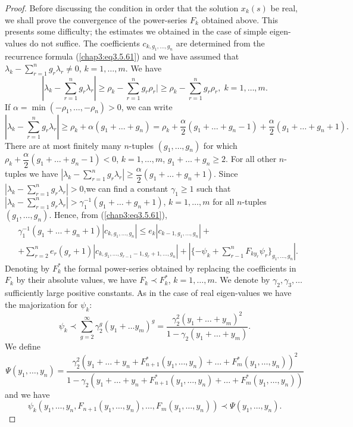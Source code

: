 \begin{proof}
Before discussing the condition in order that the solution $x_k(s)$ be
real, we shall prove the convergence of the power-series $F_k$
obtained above. This presents some difficulty; the estimates we
obtained in the case of simple eigen-values do not suffice. The
coefficients $c_{k, g_1, \ldots, g_n}$ are determined from the
recurrence formula (\ref{chap3:eq3.5.61}) and we have assumed that
$\lambda_k - \sum\limits^n_{r=1} g_r \lambda_r \neq 0$, $k=1, \ldots,
m$. We have 
$$
|\lambda_k - \sum\limits^n_{r=1} g_r \lambda_r | \geq \rho_k -
\sum\limits^n_{r=1} g_r \rho_r | \geq \rho_k - \sum\limits^n_{r=1} g_r
\rho_r, \; k =1, \ldots, m. 
$$
If $\alpha = \min (-\rho_1, \ldots, -\rho_n) > 0$, we can write  
{\fontsize{10}{12}\selectfont
$$
|\lambda_k - \sum\limits^n_{r=1} g_r \lambda_r| \geq \rho_k  + \alpha
(g_1+ \ldots + g_n) = \rho_k + \frac{\alpha}{2} (g_1 + \ldots + g_n
-1) + \frac{\alpha}{2} (g_1 + \ldots + g_n +1).  
$$}
There are at most finitely many $n$-tuples $(g_1, \ldots,g_n)$ for
which $\rho_k + \dfrac{\alpha}{2} (g_1+ \ldots + g_n -1) < 0$, $k=1,
\ldots, m$, $g_1 + \ldots + g_n \geq 2$. For all other $n$-tuples we
have $|\lambda_k - \sum\limits^n_{r=1} g_r \lambda_r| \geq
\dfrac{\alpha}{2} (g_1 + \ldots + g_n  +1)$. Since $|\lambda_k -
\sum\limits^n_{r=1} g_r \lambda_r| > 0$,\pageoriginale we can find a
constant $\gamma_1 \geq 1$ such that $|\lambda_k - \sum\limits^n_{r=1}
g_r \lambda_r| > \gamma^{-1}_1 (g_1+ \ldots + g_n +1)$, $k=1, \ldots,
m$ for all $n$-tuples $(g_1, \ldots, g_n)$. Hence, from
(\ref{chap3:eq3.5.61}), 
\begin{align*}
& \gamma^{-1}_1 (g_1 + \ldots + g_n +1) |c_{k, g_1, \ldots, g_n}| \leq
  e_k |c_{k-1, g_1, \ldots, g_n}| + \\ 
& + \sum\limits^n_{r=2} e_r (g_r+1) |c_{k, g_1, \ldots, g_{r-1} -1,
    g_r + 1, \ldots, g_n}| + |\{-\psi_k + \sum\limits^n_{r-1} F_{ky_r}
  \psi_r\}_{g_1, \ldots, g_n}|. 
\tag{3.5.62}\label{chap3:eq3.5.62}
\end{align*}
Denoting by $F^*_k$ the formal power-series obtained by replacing the
coefficients in $F_k$ by their absolute values, we have $F_k \prec
F^*_k$, $k=1, \ldots, m$. We denote by $\gamma_2, \gamma_3, \ldots$
sufficiently large positive constants. As in the case of real
eigen-values we have the majorization for $\psi_k$: 
$$
\psi_k \prec \sum\limits^\infty_{g=2} \gamma^g_2 (y_1 + \ldots y_m)^g
= \frac{\gamma^2_2 (y_1 + \ldots + y_m)^2}{1-\gamma_2 (y_1 + \ldots +
  y_m)}. 
$$
We define
{\fontsize{9}{11}\selectfont
$$
\Psi(y_1, \ldots, y_n) = \frac{\gamma^2_2 (y_1 + \ldots + y_n +
  F^*_{n+1} (y_1, \ldots, y_n) + \ldots + F^*_m (y_1, \ldots,
  y_n))^2}{1 - \gamma_2 (y_1 + \ldots + y_n + F^*_{n+1} (y_1, \ldots,
  y_n) + \ldots + F^*_m (y_1,\ldots, y_n))} 
$$}
and we have 
$$
\psi_k(y_1, \ldots, y_n, F_{n+1} (y_1,\ldots, y_n), \ldots, F_m (y_1,
\ldots, y_n)) \prec \Psi (y_1, \ldots, y_n). 
$$


\end{proof}
